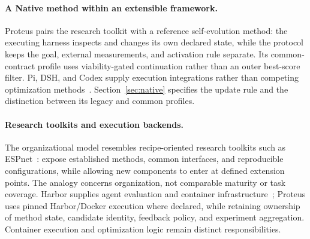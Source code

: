



\paragraph{A Native method within an extensible framework.}
Proteus pairs the research toolkit with a reference self-evolution method: the executing harness inspects and changes its own declared state, while the protocol keeps the goal, external measurements, and activation rule separate. Its common-contract profile uses viability-gated continuation rather than an outer best-score filter. Pi, DSH, and Codex supply execution integrations rather than competing optimization methods~\citep{zechner_pi_0851,dsh_software,codex_software}. Section~\ref{sec:native} specifies the update rule and the distinction between its legacy and common profiles.

\paragraph{Research toolkits and execution backends.}
The organizational model resembles recipe-oriented research toolkits such as ESPnet~\citep{espnet_software}: expose established methods, common interfaces, and reproducible configurations, while allowing new components to enter at defined extension points. The analogy concerns organization, not comparable maturity or task coverage. Harbor supplies agent evaluation and container infrastructure~\citep{harbor_software}; Proteus uses pinned Harbor/Docker execution where declared, while retaining ownership of method state, candidate identity, feedback policy, and experiment aggregation. Container execution and optimization logic remain distinct responsibilities.
